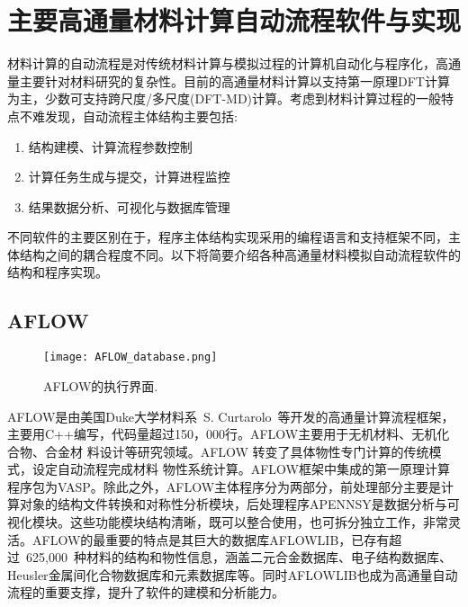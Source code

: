 \section{主要高通量材料计算自动流程软件与实现}
材料计算的自动流程是对传统材料计算与模拟过程的计算机自动化与程序化，高通量主要针对材料研究的复杂性。目前的高通量材料计算以支持第一原理\textrm{DFT}计算为主，少数可支持跨尺度/多尺度\textrm{(DFT-MD)}计算。考虑到材料计算过程的一般特点不难发现，自动流程主体结构主要包括: 
\begin{enumerate}
	\item 结构建模、计算流程参数控制 
	\item 计算任务生成与提交，计算进程监控 
	\item 结果数据分析、可视化与数据库管理 
\end{enumerate}
不同软件的主要区别在于，程序主体结构实现采用的编程语言和支持框架不同，主体结构之间的耦合程度不同。以下将简要介绍各种高通量材料模拟自动流程软件的结构和程序实现。

\subsection{\rm{AFLOW}}
\begin{figure}[h!]
\centering
\texttt{[image: AFLOW\_database.png]}%
\caption{\textrm{AFLOW}的执行界面.}%
\label{Auto_Flow_Platform-1}
\end{figure}
\textrm{AFLOW}是由美国\textrm{Duke}大学材料系~\textrm{S. Curtarolo}~等开发的高通量计算流程框架\cite{CMS49-299_2010,Nat-Mater12-191_2013}，主要用\textrm{C++}编写，代码量超过\textrm{150，000}行。\textrm{AFLOW}主要用于无机材料、无机化合物、合金材 料设计等研究领域。AFLOW 转变了具体物性专门计算的传统模式，设定自动流程完成材料 物性系统计算。\textrm{AFLOW}框架中集成的第一原理计算程序包为\textrm{VASP}。除此之外，\textrm{AFLOW}主体程序分为两部分，前处理部分主要是计算对象的结构文件转换和对称性分析模块，后处理程序\textrm{APENNSY}是数据分析与可视化模块。这些功能模块结构清晰，既可以整合使用，也可拆分独立工作，非常灵活。\textrm{AFLOW}的最重要的特点是其巨大的数据库\textrm{AFLOWLIB}，已存有超过~625,000~种材料的结构和物性信息，涵盖二元合金数据库、电子结构数据库、\textrm{Heusler}金属间化合物数据库和元素数据库等。同时\textrm{AFLOWLIB}也成为高通量自动流程的重要支撑，提升了软件的建模和分析能力。

